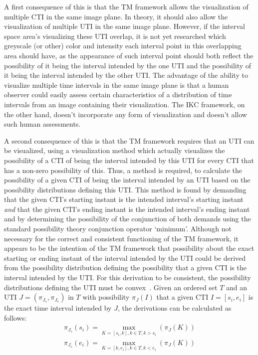 A first consequence of this is that the TM framework allows the visualization of multiple CTI in the same image plane. In theory, it should also allow the visualization of multiple UTI in the same image plane. However, if the interval space area's visualizing these UTI overlap, it is not yet researched which greyscale (or other) color and intensity each interval point in this overlapping area should have, as the appearance of such interval point should both reflect the possibility of it being the interval intended by the one UTI and the possibility of it being the interval intended by the other UTI. The advantage of the ability to visualize multiple time intervals in the same image plane is that a human observer could easily assess certain characteristics of a distribution of time intervals from an image containing their visualization. The IKC framework, on the other hand, doesn't incorporate any form of visualization and doesn't allow such human assessments.

A second consequence of this is that the TM framework requires that an UTI can be visualized, using a visualization method which actually visualizes the possibility of a CTI of being the interval intended by this UTI for every CTI that has a non-zero possibility of this. Thus, a method is required, to calculate the possibility of a given CTI of being the interval intended by an UTI based on the possibility distributions defining this UTI. This method is found by demanding that the given CTI's starting instant is the intended interval's starting instant \emph{and} that the given CTI's ending instant is the intended interval's ending instant and by determining the possibility of the conjunction of both demands using the standard possibility theory conjunction operator `minimum'. Although not necessary for the correct and consistent functioning of the TM framework, it appears to be the intention of the TM framework that possibility about the exact starting or ending instant of the interval intended by the UTI could be derived from the possibility distribution defining the possibility that a given CTI is the interval intended by the UTI. For this derivation to be consistent, the possibility distributions defining the UTI must be convex~\cite{Dubois1983}. Given an ordered set $T$ and an UTI $J = (\pi_{J_s}, \pi_{J_e})$ in $T$ with possibility $\pi_J(I)$ that a given CTI $I = \left[s_i, e_i\right]$ is the exact time interval intended by $J$, the derivations can be calculated as follows:
\vspace{-5pt}
\begin{align}
\pi_{J_s}(s_i) = \max_{K = \left[s_i, k\right], k \in T, k > s_i}(\pi_J(K)) \nonumber \\
\pi_{J_e}(e_i) = \max_{K = \left[k, e_i\right], k \in T, k < e_i}(\pi_J(K)) \nonumber
\end{align}


